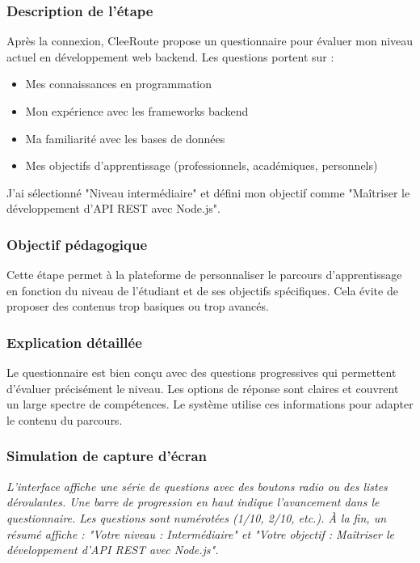 \documentclass[12pt,a4paper]{article}
\begin{document}
\subsubsection{Description de l'étape}

Après la connexion, CleeRoute propose un questionnaire pour évaluer mon niveau actuel en développement web backend. Les questions portent sur :
\begin{itemize}
    \item Mes connaissances en programmation
    \item Mon expérience avec les frameworks backend
    \item Ma familiarité avec les bases de données
    \item Mes objectifs d'apprentissage (professionnels, académiques, personnels)
\end{itemize}

J'ai sélectionné "Niveau intermédiaire" et défini mon objectif comme "Maîtriser le développement d'API REST avec Node.js".

\subsubsection{Objectif pédagogique}

Cette étape permet à la plateforme de personnaliser le parcours d'apprentissage en fonction du niveau de l'étudiant et de ses objectifs spécifiques. Cela évite de proposer des contenus trop basiques ou trop avancés.

\subsubsection{Explication détaillée}

Le questionnaire est bien conçu avec des questions progressives qui permettent d'évaluer précisément le niveau. Les options de réponse sont claires et couvrent un large spectre de compétences. Le système utilise ces informations pour adapter le contenu du parcours.

\subsubsection{Simulation de capture d'écran}

\textit{L'interface affiche une série de questions avec des boutons radio ou des listes déroulantes. Une barre de progression en haut indique l'avancement dans le questionnaire. Les questions sont numérotées (1/10, 2/10, etc.). À la fin, un résumé affiche : "Votre niveau : Intermédiaire" et "Votre objectif : Maîtriser le développement d'API REST avec Node.js".}
\end{document}
